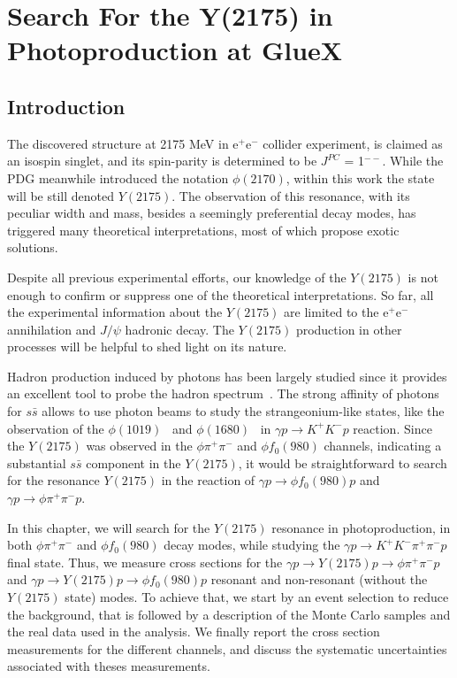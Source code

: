 \chapter{Search For the Y(2175) in Photoproduction at GlueX}
\label{p.4}

\section{Introduction}
\label{p.4.1}

The discovered structure at 2175 MeV in e$^+$e$^{-}$ collider experiment, is claimed as an isospin singlet, and its spin-parity is determined to be $J^{PC}$ = 1$^{--}$. While the PDG meanwhile introduced the notation $\phi(2170)$, within this work the state will be still denoted $Y(2175)$. The observation of this resonance, with its peculiar width and mass, besides a seemingly preferential decay modes, has triggered many theoretical interpretations, most of which propose exotic solutions. 
~\par Despite all previous experimental efforts, our knowledge of the $Y(2175)$ is not enough to confirm or suppress one of the theoretical interpretations. So far, all the experimental information about the $Y(2175)$ are limited to the e$^+$e$^{-}$ annihilation and $J/\psi$ hadronic decay. The $Y(2175)$ production in other processes will be helpful to shed light on its nature.
~\par Hadron production induced by photons has been largely studied since it provides an excellent tool to probe the hadron spectrum~\cite{Ballam68, Meyer70, Wang14, Wang17}. The strong affinity of photons for $s\bar{s}$ allows to use photon beams to study the strangeonium-like states, like the observation of the $\phi(1019)$~\cite{Mibe05} and $\phi(1680)$~\cite{Aston81} in $\gamma p \rightarrow K^{+}K^{-}p$ reaction. Since the $Y(2175)$ was observed in the $\phi \pi^{+}\pi^{-}$ and $\phi f_{0}(980)$ channels, indicating a substantial $s\bar{s}$ component in the $Y(2175)$, it would be straightforward to search for the resonance $Y(2175)$ in the reaction of $\gamma p \rightarrow \phi f_{0}(980)p$ and $\gamma p \rightarrow \phi \pi^{+}\pi^{-}p$.
~\par In this chapter, we will search for the $Y(2175)$ resonance in photoproduction, in both $\phi \pi^{+}\pi^{-}$ and $\phi f_{0}(980)$ decay modes, while studying the $\gamma p \rightarrow K^{+}K^{-} \pi^{+}\pi^{-} p$ final state. Thus, we measure cross sections for the $\gamma p \rightarrow Y(2175) p \rightarrow \phi \pi^+ \pi^{-} p$ and $\gamma p \rightarrow Y(2175) p \rightarrow \phi f_{0}(980) p$ resonant and non-resonant (without the $Y(2175)$ state) modes. To achieve that, we start by an event selection to reduce the background, that is followed by a description of the Monte Carlo samples and the real data used in the analysis. We finally report the cross section measurements for the different channels, and discuss the systematic uncertainties associated with theses measurements.


